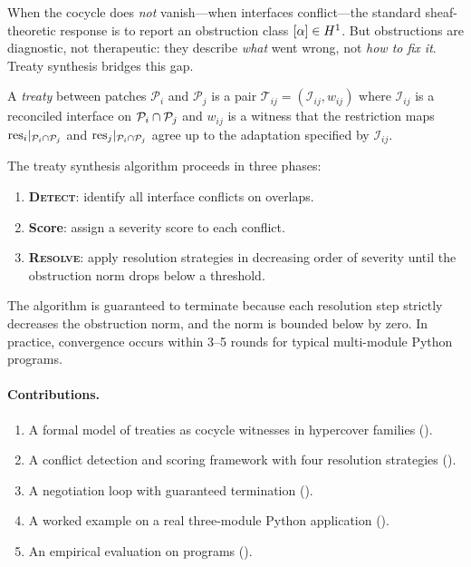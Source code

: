 \documentclass[11pt]{article}
\newcommand{\treaty}{\mathcal{T}}
\newcommand{\patch}{\mathcal{P}}
\newcommand{\iface}{\mathcal{I}}
\newcommand{\detect}{\textsc{Detect}}
\newcommand{\resolve}{\textsc{Resolve}}
\begin{document}
When the cocycle does \emph{not} vanish---when interfaces conflict---the
standard sheaf-theoretic response is to report an obstruction class
$[\alpha] \in H^{1}$.  But obstructions are diagnostic, not
therapeutic: they describe \emph{what} went wrong, not \emph{how to fix
it}.  Treaty synthesis bridges this gap.

\begin{definition}[Treaty]\label{def:treaty}
A \emph{treaty} between patches $\patch_i$ and $\patch_j$ is a pair
$\treaty_{ij} = (\iface_{ij}, w_{ij})$ where $\iface_{ij}$ is a
reconciled interface on $\overlap{\patch_i}{\patch_j}$ and $w_{ij}$
is a witness that the restriction maps
$\res_i|_{\overlap{\patch_i}{\patch_j}}$ and
$\res_j|_{\overlap{\patch_i}{\patch_j}}$ agree up to the adaptation
specified by $\iface_{ij}$.
\end{definition}

The treaty synthesis algorithm proceeds in three phases:
\begin{enumerate}[nosep]
\item \textbf{\detect{}}: identify all interface conflicts on overlaps.
\item \textbf{Score}: assign a severity score to each conflict.
\item \textbf{\resolve{}}: apply resolution strategies in decreasing
  order of severity until the obstruction norm drops below a threshold.
\end{enumerate}

The algorithm is guaranteed to terminate because each resolution step
strictly decreases the obstruction norm, and the norm is bounded below
by zero.  In practice, convergence occurs within 3--5 rounds for
typical multi-module Python programs.

\paragraph{Contributions.}
\begin{enumerate}[nosep]
\item A formal model of treaties as cocycle witnesses in hypercover
  families ().
\item A conflict detection and scoring framework with four resolution
  strategies ().
\item A negotiation loop with guaranteed termination
  ().
\item A worked example on a real three-module Python application
  ().
\item An empirical evaluation on \expTotalPrograms{} programs
  ().
\end{enumerate}
\end{document}
